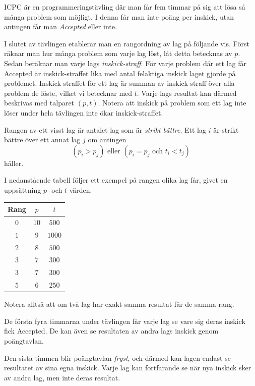 
ICPC är en programmeringstävling där man får fem timmar på sig att lösa så många problem som möjligt.
I denna får man inte poäng per inskick, utan antingen får man \textit{Accepted} eller inte.

I slutet av tävlingen etablerar man en rangordning av lag på följande vis.
Först räknar man hur många problem som varje lag löst, låt detta betecknas av $p$.
Sedan beräknar man varje lags \textit{inskick-straff}.
För varje problem där ett lag får Accepted är inskick-straffet lika med antal felaktiga inskick laget gjorde på problemet.
Inskick-straffet för ett lag är summan av inskick-straff över alla problem de löste, vilket vi betecknar med $t$.
Varje lags resultat kan därmed beskrivas med talparet $(p,t)$.
Notera att inskick på problem som ett lag inte löser under hela tävlingen inte ökar inskick-straffet.

Rangen av ett visst lag är antalet lag som är \textit{strikt bättre}.
Ett lag $i$ är strikt bättre över ett annat lag $j$ om antingen
$$(p_i>p_j) \text{ eller } (p_i=p_j \text{ och } t_i < t_j)$$
håller.

I nedanstående tabell följer ett exempel på rangen olika lag får, givet en uppsättning $p$- och $t$-värden.

\begin{center}
\noindent
\begin{tabular}{| c | c | c |}
  \hline
  Rang & $p$ & $t$ \\ \hline
  $0$ & $10$ & $500$ \\ \hline
  $1$ & $9$ & $1000$ \\ \hline
  $2$ & $8$ & $500$ \\ \hline
  $3$ & $7$ & $300$ \\ \hline
  $3$ & $7$ & $300$ \\ \hline
  $5$ & $6$ & $250$ \\ \hline
\end{tabular}
\end{center}

Notera alltså att om två lag har exakt samma resultat får de samma rang.

De första fyra timmarna under tävlingen får varje lag se vare sig deras inskick fick Accepted.
De kan även se resultaten av andra lags inskick genom poängtavlan.

Den sista timmen blir poängtavlan \textit{fryst}, och därmed kan lagen endast se resultatet av sina egna inskick.
Varje lag kan fortfarande se när nya inskick sker av andra lag, men inte deras resultat.

